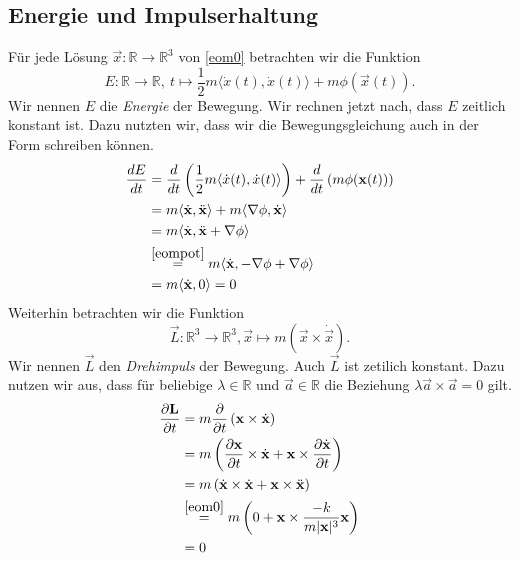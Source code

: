 \subsection{Energie und Impulserhaltung}
  Für jede Lösung $\vec{x}:\mathbb{R}\to \mathbb{R}^3$ von \eqref{eom0} betrachten wir die Funktion
  \[
  E:\mathbb{R} \to \mathbb{R},~t\mapsto \frac{1}{2}m\langle\dot{x}(t),\dot{x}(t)\rangle + m \phi(\vec{x}(t)).
  \]
  Wir nennen $E$ die \emph{Energie} der Bewegung. Wir rechnen jetzt nach, dass $E$ zeitlich konstant ist. Dazu nutzten wir, dass wir die Bewegungsgleichung auch in der Form \label{eompot} schreiben können.
  \begin{align*}
    \frac{dE}{dt} &= \frac{d}{dt}\left(\frac{1}{2}m\langle\dot{x}(t),\dot{x}(t)\rangle \right) + \frac{d}{dt}\left(m\phi(\vec{x}(t))\right)\\
     &= m \langle \dot{\vec{x}},\ddot{\vec{x}}\rangle + m \langle \nabla \phi , \dot{\vec{x}}\rangle\\
    &= m \langle \dot{\vec{x}}, \ddot{\vec{x}} + \nabla \phi\rangle\\
    &\overset{\eqref{eompot}}{=} m \langle \dot{\vec{x}}, -\nabla \phi + \nabla \phi \rangle \\
    &= m \langle \dot{\vec{x}},0 \rangle = 0
  \end{align*}
  Weiterhin betrachten wir die Funktion
  \[
  \vec{L}:\mathbb{R}^3\to \mathbb{R}^3, \vec{x}\mapsto m\left(\vec{x}\times \dot{\vec{x}}\right).
  \]
  Wir nennen $\vec{L}$ den \emph{Drehimpuls} der Bewegung. Auch $\vec{L}$ ist zetilich konstant. Dazu nutzen wir aus, dass für beliebige $\lambda \in \mathbb{R}$ und $\vec{a}\in \mathbb{R}$ die Beziehung $\lambda\vec{a}\times \vec{a}=0$ gilt.
  \begin{align*}
  \frac{\partial \vec{L}}{\partial t}&= m \frac{\partial}{\partial t}\left(\vec{x}\times \dot{\vec{x}}\right)\\
  &= m \left(\frac{\partial \vec{x}}{\partial t}\times \dot{\vec{x}} + \vec{x}\times \frac{\partial \dot{\vec{x}}}{\partial t} \right)\\
  &= m \left(\dot{\vec{x}}\times \dot{\vec{x}} + \vec{x}\times \ddot{\vec{x}} \right)\\
  &\overset{\eqref{eom0}}= m \left(0 + \vec{x}\times \frac{-k}{m|\vec{x}|^3}\vec{x}\right)\\
  &= 0
  \end{align*}
